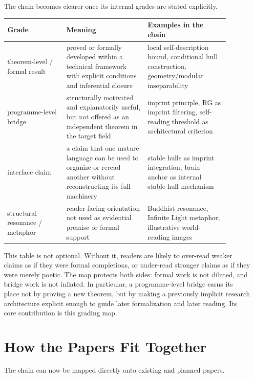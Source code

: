 \documentclass[12pt]{article}
\begin{document}
The chain becomes clearer once its internal grades are stated explicitly.

\begin{center}
\begin{tabular}{P{0.24\linewidth}P{0.33\linewidth}P{0.33\linewidth}}
\toprule
\textbf{Grade} & \textbf{Meaning} & \textbf{Examples in the chain} \\
\midrule
theorem-level / formal result & proved or formally developed within a technical framework with explicit conditions and inferential closure & local self-description bound, conditional hull construction, geometry/modular inseparability \\
programme-level bridge & structurally motivated and explanatorily useful, but not offered as an independent theorem in the target field & imprint principle, RG as imprint filtering, self-reading threshold as architectural criterion \\
interface claim & a claim that one mature language can be used to organize or reread another without reconstructing its full machinery & stable hulls as imprint integration, brain anchor as internal stable-hull mechanism \\
structural resonance / metaphor & reader-facing orientation not used as evidential premise or formal support & Buddhist resonance, Infinite Light metaphor, illustrative world-reading images \\
\bottomrule
\end{tabular}
\end{center}

This table is not optional. Without it, readers are likely to over-read weaker claims as if they were formal completions, or under-read stronger claims as if they were merely poetic. The map protects both sides: formal work is not diluted, and bridge work is not inflated. In particular, a programme-level bridge earns its place not by proving a new theorem, but by making a previously implicit research architecture explicit enough to guide later formalization and later reading.
Its core contribution is this grading map.

\section{How the Papers Fit Together}

The chain can now be mapped directly onto existing and planned papers.
\end{document}
